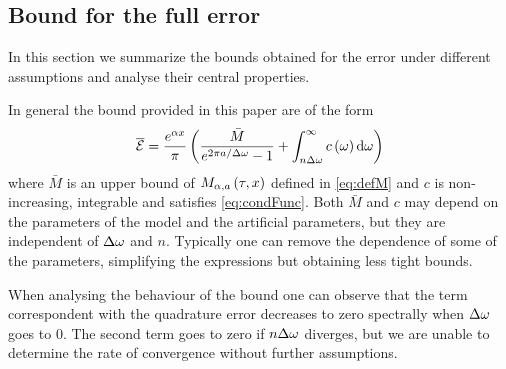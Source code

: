 \documentclass[11pt]{amsart}
\begin{document}
\subsection{Bound for the full error}

In this section we summarize the bounds obtained for the error under different 
assumptions and analyse their central properties. 

In general the bound provided in this paper are of the form
\begin{equation}\label{eq:fullErrorGeneral}
\overline {\mathcal{E}} = \frac{e^{\alpha x}}{\pi}\left( { \frac{\bar{M}}{e^{2\pi a/\Delta\omega}-1} +  \int_{n\Delta\omega}^{\infty}  c\left( {\omega} \right) \textrm{d} \omega} \right)
\end{equation}
where $\bar{M}$ is an upper bound of $M_{\alpha,a}\left( {\tau,x} \right)$ defined in \eqref{eq:defM} and $c$ is non-increasing, integrable and satisfies
\eqref{eq:condFunc}. Both $\bar{M}$ and $c$ may depend on the 
parameters of the model and the artificial parameters, but they are independent of $\Delta\omega$ and $n$. Typically one can remove 
the dependence of some of the parameters, simplifying the expressions but obtaining
less tight bounds.

When analysing the behaviour of the bound one can observe that the term correspondent with the quadrature error decreases to zero
spectrally when $\Delta\omega$ goes to 0. 
The second term goes to zero if $n\Delta\omega$ diverges, but we are unable to determine
the rate of convergence without further assumptions.
\end{document}
